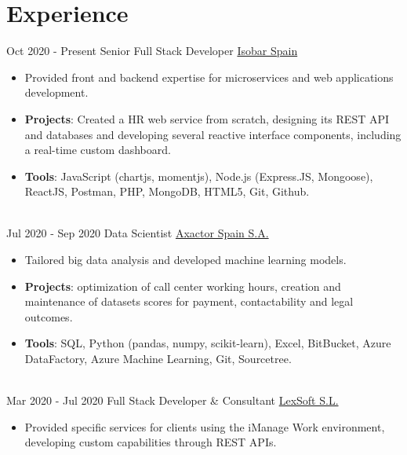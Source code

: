 \documentclass[letterpaper]{twentysecondcv} %
\begin{document}
\makeprofile %
 

\section{Experience}
\begin{twenty} %
    \twentyitem
    	{Oct 2020 -}
		{Present}
        {Senior Full Stack Developer}
        {\href{https://www.isobar.com/es-es}{Isobar Spain}}
        {}
        {\begin{itemize}
        \item Provided front and backend expertise for microservices and web applications development.
        \item \textbf{Projects}: Created a HR web service from scratch, designing its REST API and databases and developing several reactive interface components, including a real-time custom dashboard.
        \item \textbf{Tools}: JavaScript (chartjs, momentjs), Node.js (Express.JS, Mongoose), ReactJS, Postman, PHP, MongoDB, HTML5, Git, Github.
        \end{itemize}}
        \\
    \twentyitem
    	{Jul 2020 -}
		{Sep 2020}
        {Data Scientist}
        {\href{https://www.axactor.com/}{Axactor Spain S.A.}}
        {}
        {\begin{itemize}
        \item Tailored big data analysis and developed machine learning models.
        \item \textbf{Projects}: optimization of call center working hours, creation and maintenance of datasets scores for payment, contactability and legal outcomes.
        \item \textbf{Tools}: SQL, Python (pandas, numpy, scikit-learn), Excel, BitBucket, Azure DataFactory, Azure Machine Learning, Git, Sourcetree.
        \end{itemize}}
        \\
	\twentyitem
    	{Mar 2020 -}
		{Jul 2020}
        {Full Stack Developer \& Consultant}
        {\href{www.lex-soft.com}{LexSoft S.L.}}
        {}
        {
        {\begin{itemize}
        \item Provided specific services for clients using the iManage Work environment, developing custom capabilities through REST APIs.

\end{itemize}}}
\end{twenty}
\end{document}
